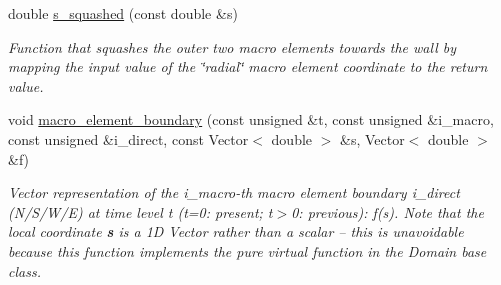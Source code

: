 \begin{DoxyCompactItemize}
double \hyperlink{classoomph_1_1QuarterCircleSectorDomain_a5b66f846233b3cf976ed63d9bf54f0c7}{s\+\_\+squashed} (const double \&s)
\begin{DoxyCompactList}\small\item\em Function that squashes the outer two macro elements towards the wall by mapping the input value of the \char`\"{}radial\char`\"{} macro element coordinate to the return value. \end{DoxyCompactList}\item 
void \hyperlink{classoomph_1_1QuarterCircleSectorDomain_a9faddf9d13e0a7633f732bac1ddda80b}{macro\+\_\+element\+\_\+boundary} (const unsigned \&t, const unsigned \&i\+\_\+macro, const unsigned \&i\+\_\+direct, const Vector$<$ double $>$ \&s, Vector$<$ double $>$ \&f)
\begin{DoxyCompactList}\small\item\em Vector representation of the i\+\_\+macro-\/th macro element boundary i\+\_\+direct (N/\+S/\+W/E) at time level t (t=0\+: present; t$>$0\+: previous)\+: f(s). Note that the local coordinate {\bfseries s} is a 1D Vector rather than a scalar -- this is unavoidable because this function implements the pure virtual function in the Domain base class. \end{DoxyCompactList}\end{DoxyCompactItemize}
